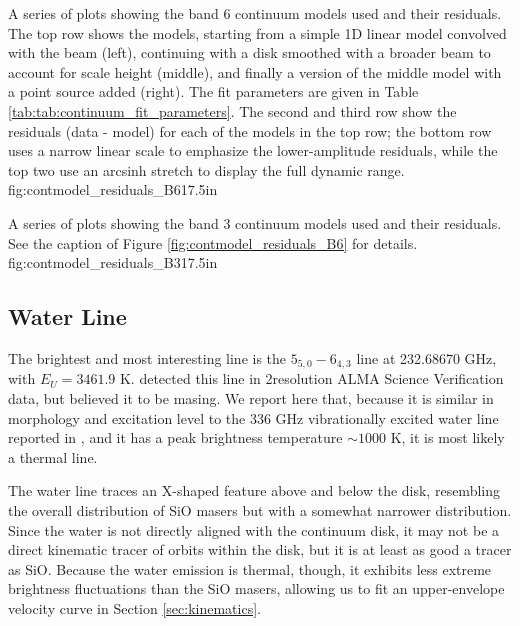 \documentclass[twocolumn]{aastex61}
\begin{document}
{A series of plots showing the band 6 continuum models used and their residuals.
The top row shows the models, starting from a simple 1D linear model convolved
with the beam (left), continuing with a disk smoothed with a broader beam to
account for scale height (middle), and finally a version of the middle model
with a point source added (right).  The fit parameters are given in Table
\ref{tab:tab:continuum_fit_parameters}.  The second and third row show the
residuals (data - model) for each of the models in the top row; the bottom row
uses a narrow linear scale to emphasize the lower-amplitude residuals, while
the top two use an arcsinh stretch to display the full dynamic range.
}
{fig:contmodel_residuals_B6}{1}{7.5in}


{A series of plots showing the band 3 continuum models used and their residuals.
See the caption of Figure \ref{fig:contmodel_residuals_B6} for details.
}
{fig:contmodel_residuals_B3}{1}{7.5in}



\subsection{Water Line}
The brightest and most interesting line is the \water $5_{5,0}-6_{4,3}$ line at
232.68670 GHz, with $E_U=3461.9$ K.  \citet{Hirota2012a} detected this line
in 2\arcsec resolution ALMA Science Verification data, but believed it to be
masing.  We report here that, because it is similar in morphology and
excitation level to the 336 GHz vibrationally excited water line reported in
\citet{Hirota2014a}, and it has a peak brightness temperature $\sim1000$ K, it
is most likely a thermal line.

The water line traces an X-shaped feature above and below the disk, 
resembling the overall distribution of SiO masers but with a somewhat narrower
distribution.  Since the water is not directly aligned with the continuum
disk, it may not be a direct kinematic tracer of orbits within the disk,
but it is at least as good a tracer as SiO.  Because the water emission is
thermal, though, it exhibits less extreme brightness fluctuations than 
the SiO masers, allowing us to fit an upper-envelope velocity curve in Section
\ref{sec:kinematics}.
\end{document}
